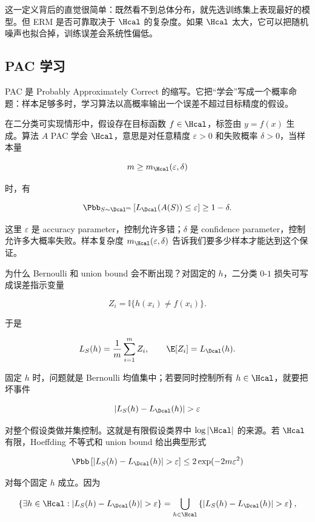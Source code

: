 这一定义背后的直觉很简单：既然看不到总体分布，就先选训练集上表现最好的模型。但 ERM 是否可靠取决于 \(\Hcal\) 的复杂度。如果 \(\Hcal\) 太大，它可以把随机噪声也拟合掉，训练误差会系统性偏低。

\subsection{PAC 学习}


PAC 是 Probably Approximately Correct 的缩写。它把“学会”写成一个概率命题：样本足够多时，学习算法以高概率输出一个误差不超过目标精度的假设。

在二分类可实现情形中，假设存在目标函数 \(f\in\Hcal\)，标签由 \(y=f(x)\) 生成。算法 \(A\) PAC 学会 \(\Hcal\)，意思是对任意精度 \(\varepsilon>0\) 和失败概率 \(\delta>0\)，当样本量

\[
  m\ge m_{\Hcal}(\varepsilon,\delta)
\]

时，有

\[
  \Pbb_{S\sim \Dcal^m}
  \left[
    L_{\Dcal}(A(S))\le \varepsilon
  \right]
  \ge 1-\delta.
\]

这里 \(\varepsilon\) 是 accuracy parameter，控制允许多错；\(\delta\) 是 confidence parameter，控制允许多大概率失败。样本复杂度 \(m_{\Hcal}(\varepsilon,\delta)\) 告诉我们要多少样本才能达到这个保证。

为什么 Bernoulli 和 union bound 会不断出现？对固定的 \(h\)，二分类 \(0\)-\(1\) 损失可写成误差指示变量

\[
  Z_i=\mathbb{I}\{h(x_i)\ne f(x_i)\}.
\]

于是

\[
  L_S(h)=\frac1m\sum_{i=1}^{m}Z_i,
  \qquad
  \E[Z_i]=L_{\Dcal}(h).
\]

固定 \(h\) 时，问题就是 Bernoulli 均值集中；若要同时控制所有 \(h\in\Hcal\)，就要把坏事件

\[
  \left|L_S(h)-L_{\Dcal}(h)\right|>\varepsilon
\]

对整个假设类做并集控制。这就是有限假设类界中 \(\log|\Hcal|\) 的来源。若 \(\Hcal\) 有限，Hoeffding 不等式和 union bound 给出典型形式

\[
  \Pbb\left[
    |L_S(h)-L_{\Dcal}(h)|>\varepsilon
  \right]
  \le
  2\exp(-2m\varepsilon^2)
\]

对每个固定 \(h\) 成立。因为

\[
  \left\{
    \exists h\in\Hcal:
    |L_S(h)-L_{\Dcal}(h)|>\varepsilon
  \right\}
  =
  \bigcup_{h\in\Hcal}
  \left\{
    |L_S(h)-L_{\Dcal}(h)|>\varepsilon
  \right\},
\]

